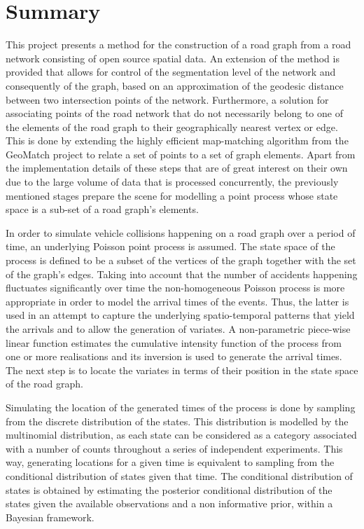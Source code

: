 \documentclass[12pt]{article}
\theoremstyle{definition}
\begin{document}
\section{Summary}
This project presents a method for the construction of a road graph from a road network consisting of open source spatial data. An extension of the method is provided that allows for control of the segmentation level of the network and consequently of the graph, based on an approximation of the geodesic distance between two intersection points of the network. Furthermore, a solution for associating points of the road network that do not necessarily belong to one of the elements of the road graph to their geographically nearest vertex or edge. This is done by extending the highly efficient map-matching algorithm from the GeoMatch project to relate a set of points to a set of graph elements. Apart from the implementation details of these steps that are of great interest on their own due to the large volume of data that is processed concurrently, the previously mentioned stages prepare the scene for modelling a point process whose state space is a sub-set of a road graph's elements.

In order to simulate vehicle collisions happening on a road graph over a period of time, an underlying Poisson point process is assumed. The state space of the process is defined to be a subset of the vertices of the graph together with the set of the graph's edges. Taking into account that the number of accidents happening fluctuates significantly over time the non-homogeneous Poisson process is more appropriate in order to model the arrival times of the events. Thus, the latter is used in an attempt to capture the underlying spatio-temporal patterns that yield the arrivals and to allow the generation of variates. A non-parametric piece-wise linear function estimates the cumulative intensity function of the process from one or more realisations and its inversion is used to generate the arrival times. The next step is to locate the variates in terms of their position in the state space of the road graph.

Simulating the location of the generated times of the process is done by sampling from the discrete distribution of the states. This distribution is modelled by the multinomial distribution, as each state can be considered as a category associated with a number of counts throughout a series of independent experiments. This way, generating locations for a given time is equivalent to sampling from the conditional distribution of states given that time. The conditional distribution of states is obtained by estimating the posterior conditional distribution of the states given the available observations and a non informative prior, within a Bayesian framework. 
\end{document}
